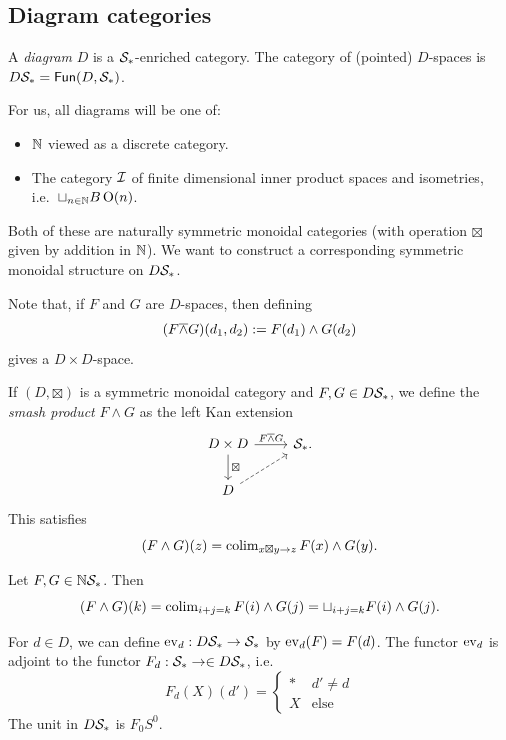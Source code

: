 \documentclass{article}
\begin{document}
\subsection{Diagram categories}

\begin{dfn}
  A \emph{diagram} $D$ is a $\mathcal{S}_*$-enriched category.
  The category of (pointed) $D$-spaces is $D\mathcal{S}_* = \mathsf{Fun}(D, \mathcal{S}_*)$.
\end{dfn}

For us, all diagrams will be one of:
\begin{itemize}
  \item $\mathbb{N}$ viewed as a discrete category.
  \item The category $\mathcal{I}$ of finite dimensional inner product spaces and isometries, i.e.\ $\sqcup_{n \in \mathbb{N}} B\operatorname{O}(n)$.
\end{itemize}
Both of these are naturally symmetric monoidal categories (with operation $\boxtimes$ given by addition in $\mathbb{N}$).
We want to construct a corresponding symmetric monoidal structure on $D\mathcal{S}_*$.

Note that, if $F$ and $G$ are $D$-spaces, then defining
\[
  (F \overline{\wedge} G)(d_1, d_2)  := F(d_1) \wedge G(d_2)
\]
gives a $D \times D$-space.

\begin{dfn}
  If $(D, \boxtimes)$ is a symmetric monoidal category and $F, G \in D\mathcal{S}_*$, we define the \emph{smash product} $F \wedge G$ as the left Kan extension
  \[
    \begin{tikzcd}
      D \times D \dar["\boxtimes"] \rar["F \ol{\wedge} G"] & \Sc_*. \\
      D \ar[ur, dashed]
    \end{tikzcd}
  \]
  This satisfies
  \[
    (F \wedge G)(z) = \operatorname{colim}_{x \boxtimes y \to z} F(x) \wedge G(y).
  \]
\end{dfn}

\begin{ex}
  Let $F, G \in \mathbb{N}\mathcal{S}_*$.
  Then
  \[
    (F \wedge G)(k) = \operatorname{colim}_{i+j=k} F(i) \wedge G(j) = \sqcup_{i+j=k} F(i) \wedge G(j).
  \]
\end{ex}

For $d \in D$, we can define $\operatorname{ev}_d: D\mathcal{S}_* \to \mathcal{S}_*$ by $\operatorname{ev}_d(F) = F(d)$.
The functor $\operatorname{ev}_d$ is adjoint to the functor $F_d: \mathcal{S}_* \to \in D\mathcal{S}_*$, i.e.\
\[
  F_d(X)(d') = \begin{cases}
    * & d' \neq d \\
    X & \textrm{else}
  \end{cases}
\]
The unit in $D\mathcal{S}_*$ is $F_0 S^0$.
\end{document}
